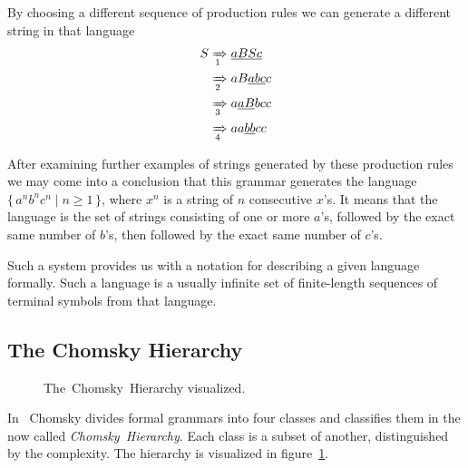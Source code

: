 \documentclass[english,engineering]{wizthesis}
\begin{document}
By choosing a different sequence of production rules we can generate a different
string in that language
\begin{equation*}
\begin{split}
  S & \xRightarrow[1]{} \underline{aBSc} \\
    & \xRightarrow[2]{} aB\underline{abc}c \\
    & \xRightarrow[3]{} a\underline{aB}bcc \\
    & \xRightarrow[4]{} aa\underline{bb}cc
\end{split}
\end{equation*}

After examining further examples of strings generated by these production rules
we may come into a conclusion that this grammar generates the language
$\{\,a^nb^nc^n \mid n \ge 1\,\}$, where $x^n$ is a string of $n$ consecutive $x$'s.
It means that the language is the set of strings consisting of one or more
$a$'s, followed by the exact same number of $b$'s, then followed by the exact
same number of $c$'s.

Such a system provides us with a notation for describing a given
language formally. Such a language is a usually infinite set of finite-length
sequences of terminal symbols from that language.

\subsection{The Chomsky Hierarchy}

\begin{figure}
  \centering
  \caption{The~Chomsky~Hierarchy visualized.}
  \label{fig:chomsky-hierarchy}
\end{figure}

In~\cite{chomsky-1956} Chomsky divides formal grammars into four classes and
classifies them in the now called \emph{Chomsky~Hierarchy}. Each class is a
subset of another, distinguished by the complexity. The hierarchy is visualized
in figure~\ref{fig:chomsky-hierarchy}.
\end{document}

